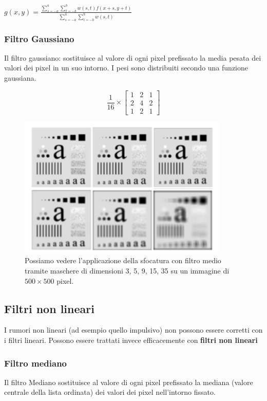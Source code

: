 \begin{center}
    $g(x,y)=\frac{\sum_{s=-a}^{a}\sum_{t=-b}^{b}w(s,t)f(x+s,y+t)}{\sum_{s=-a}^{a}\sum_{t=-b}^{b}w(s,t)}$
\end{center}

\subsubsection{Filtro Gaussiano}
Il filtro gaussiano: sostituisce al valore di ogni pixel prefissato la media
pesata dei valori dei pixel in un suo intorno. I pesi sono distribuiti secondo
una funzione gaussiana.

\[
    \frac{1}{16} \times
    \begin{bmatrix}
        1 & 2 & 1 \\
        2 & 4 & 2 \\
        1 & 2 & 1
    \end{bmatrix}
\]

\begin{figure}[H]
    \centering
    \includegraphics[width=10cm, keepaspectratio]{capitoli/immagini/imgs/filtri-l-esempio.png}
    \caption{Possiamo vedere l'applicazione della sfocatura con filtro medio
        tramite maschere di dimensioni 3, 5, 9, 15, 35 su un immagine di $500
            \times 500$ pixel.}
\end{figure}

\subsection{Filtri non lineari}
I rumori non lineari (ad esempio quello impulsivo) non possono essere corretti
con i filtri lineari. Possono essere trattati invece efficacemente con
\textbf{filtri non lineari}
\subsubsection{Filtro mediano}
Il filtro Mediano sostituisce al valore di ogni pixel prefissato la mediana
(valore centrale della lista ordinata) dei valori dei pixel nell'intorno
fissato.

